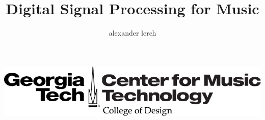 \title[]{Digital Signal Processing for Music}   
\author[alexander lerch]{alexander lerch} 


\begin{frame}
    \titlepage
    \begin{flushright}
        \href{http://www.gtcmt.gatech.edu}{\includegraphics[height=.8cm,keepaspectratio]{../shared/Logo_GTCMT_black}}
    \end{flushright}
\end{frame}
